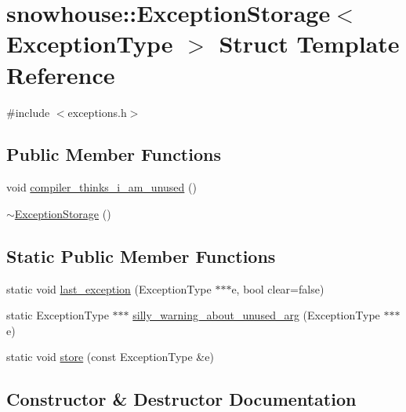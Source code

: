 \hypertarget{structsnowhouse_1_1ExceptionStorage}{}\section{snowhouse\+::Exception\+Storage$<$ Exception\+Type $>$ Struct Template Reference}
\label{structsnowhouse_1_1ExceptionStorage}


{\ttfamily \#include $<$exceptions.\+h$>$}

\subsection*{Public Member Functions}
\begin{DoxyCompactItemize}
\item 
void \mbox{\hyperlink{structsnowhouse_1_1ExceptionStorage_a7dbf2475bccfd2a237ca327a45aff492}{compiler\+\_\+thinks\+\_\+i\+\_\+am\+\_\+unused}} ()
\item 
\mbox{\hyperlink{structsnowhouse_1_1ExceptionStorage_a261c73a475ce1926a5a8253c6106a7b8}{$\sim$\+Exception\+Storage}} ()
\end{DoxyCompactItemize}
\subsection*{Static Public Member Functions}
\begin{DoxyCompactItemize}
\item 
static void \mbox{\hyperlink{structsnowhouse_1_1ExceptionStorage_a1366c989b6b4ab0ae03b1bba32374e15}{last\+\_\+exception}} (Exception\+Type $\ast$$\ast$$\ast$e, bool clear=false)
\item 
static Exception\+Type $\ast$$\ast$$\ast$ \mbox{\hyperlink{structsnowhouse_1_1ExceptionStorage_a8e72957800caebd34f6ea498951c7fdd}{silly\+\_\+warning\+\_\+about\+\_\+unused\+\_\+arg}} (Exception\+Type $\ast$$\ast$$\ast$e)
\item 
static void \mbox{\hyperlink{structsnowhouse_1_1ExceptionStorage_ab7b898375f4cb8daabbd912a3093b577}{store}} (const Exception\+Type \&e)
\end{DoxyCompactItemize}


\subsection{Constructor \& Destructor Documentation}
\mbox{\label{structsnowhouse_1_1ExceptionStorage_a261c73a475ce1926a5a8253c6106a7b8}} 
